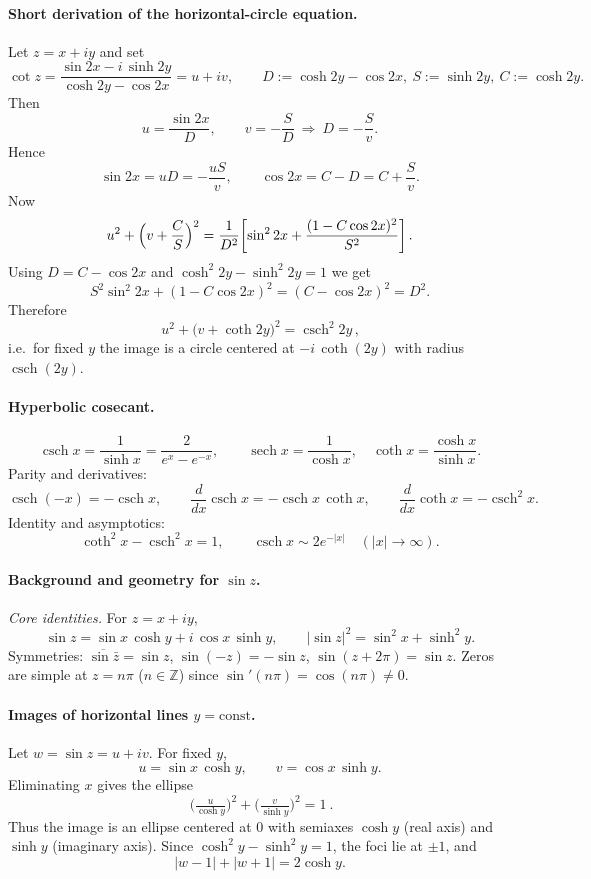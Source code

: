\documentclass[11pt,a4paper]{article}
\theoremstyle{definition}
\theoremstyle{definition}
\theoremstyle{plain}
\theoremstyle{remark}
\DeclareMathOperator{\csch}{csch} %
\DeclareMathOperator{\sech}{sech}
\begin{document}
\paragraph{Short derivation of the horizontal-circle equation.}
Let $z=x+iy$ and set
\[
\cot z=\frac{\sin 2x-i\,\sinh 2y}{\cosh 2y-\cos 2x}=u+iv,\qquad
D:=\cosh 2y-\cos 2x,\ S:=\sinh 2y,\ C:=\cosh 2y.
\]
Then
\[
u=\frac{\sin 2x}{D},\qquad v=-\frac{S}{D}\ \Longrightarrow\ D=-\frac{S}{v}.
\]
Hence
\[
\sin 2x=uD=-\frac{uS}{v},\qquad \cos 2x = C - D = C+\frac{S}{v}.
\]
Now
\[
u^{2}+\Bigl(v+\frac{C}{S}\Bigr)^{2}
=\frac{1}{D^{2}}\!\left[\sin^{2}2x+\frac{(1-C\cos 2x)^{2}}{S^{2}}\right].
\]
Using $D=C-\cos 2x$ and $\cosh^{2}2y-\sinh^{2}2y=1$ we get
\[
S^{2}\sin^{2}2x+(1-C\cos 2x)^{2}=(C-\cos 2x)^{2}=D^{2}.
\]
Therefore
\[
\boxed{\,u^{2}+\bigl(v+\coth 2y\bigr)^{2}=\csch^{2}2y\,},
\]
i.e.\ for fixed $y$ the image is a circle centered at $-i\,\coth(2y)$ with radius $\csch(2y)$.
	
	
\paragraph{Hyperbolic cosecant.}
\[
\csch x=\frac{1}{\sinh x}=\frac{2}{e^{x}-e^{-x}},\qquad
\sech x=\frac{1}{\cosh x},\quad
\coth x=\frac{\cosh x}{\sinh x}.
\]
Parity and derivatives:
\[
\csch(-x)=-\csch x,\qquad
\frac{d}{dx}\csch x=-\csch x\,\coth x,\qquad
\frac{d}{dx}\coth x=-\csch^{2}x.
\]
Identity and asymptotics:
\[
\coth^{2}x-\csch^{2}x=1,\qquad
\csch x\sim 2e^{-|x|}\quad (|x|\to\infty).
\]


\paragraph{Background and geometry for $\sin z$.}

\emph{Core identities.} For $z=x+iy$,
\[
\sin z=\sin x\,\cosh y+i\,\cos x\,\sinh y,\qquad
|\sin z|^{2}=\sin^{2}x+\sinh^{2}y.
\]
Symmetries: $\overline{\sin\bar z}=\sin z$, $\sin(-z)=-\sin z$, $\sin(z+2\pi)=\sin z$.
Zeros are simple at $z=n\pi$ ($n\in\mathbb Z$) since $\sin'(n\pi)=\cos(n\pi)\neq0$.

\medskip
\paragraph{Images of horizontal lines $y=\text{const}$.}
Let $w=\sin z=u+iv$. For fixed $y$,
\[
u=\sin x\,\cosh y,\qquad v=\cos x\,\sinh y.
\]
Eliminating $x$ gives the ellipse
\[
\boxed{\ \Big(\tfrac{u}{\cosh y}\Big)^{2}+\Big(\tfrac{v}{\sinh y}\Big)^{2}=1\ }.
\]
Thus the image is an ellipse centered at $0$ with semiaxes $\cosh y$ (real axis) and $\sinh y$ (imaginary axis).
Since $\cosh^{2}y-\sinh^{2}y=1$, the foci lie at $\pm1$, and
\[
|w-1|+|w+1|=2\cosh y.
\]
\end{document}
